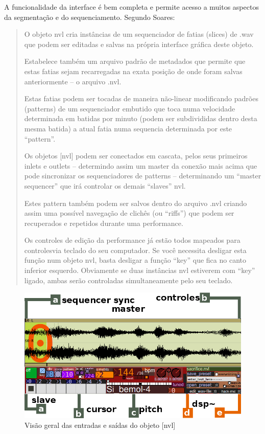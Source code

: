\documentclass{ppgmus}
\begin{document}
A funcionalidade da interface é bem completa e permite acesso a muitos aspectos da segmentação e do
sequenciamento. Segundo Soares:

\begin{quotation}
 O objeto nvl cria instâncias de um sequenciador de fatias (slices) de .wav que podem ser editadas e salvas na 
própria interface gráfica deste objeto.

Estabelece também um arquivo padrão de metadados que permite que estas fatias sejam recarregadas na 
exata posição de onde foram salvas anteriormente – o arquivo .nvl.

Estas fatias podem ser tocadas de maneira não-linear modificando padrões (patterns) de um sequenciador 
embutido que toca numa velocidade determinada em batidas por minuto (podem ser subdivididas dentro desta 
mesma batida) a atual fatia numa sequencia determinada por este “pattern”.

Os objetos [nvl] podem ser conectados em cascata, pelos seus primeiros inlets e outlets – determindo 
assim um master da conexão mais acima que pode sincronizar os sequenciadores de patterns – determinando um 
“master sequencer” que irá controlar os demais “slaves” nvl.

Estes pattern também podem ser salvos dentro do arquivo .nvl criando assim uma possível navegação de clichês 
(ou “riffs”) que podem ser recuperados e repetidos durante uma performance.

Os controles de edição da performance já estão todos mapeados para controlesvia teclado do seu computador. 
Se você necessita desligar esta função num objeto nvl, basta desligar a função “key” que fica no canto inferior 
esquerdo. Obviamente se duas instâncias nvl estiverem com “key” ligado, ambas serão controladas simultaneamente 
pelo seu teclado.
\end{quotation} 

\begin{figure}
\includegraphics[scale=.6]{nvl1}
\caption{Visão geral das entradas e saídas do objeto [nvl]}
\label{nvl1}
\end{figure}
\end{document}
